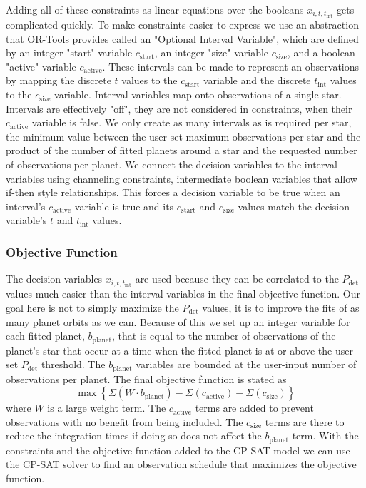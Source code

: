 Adding all of these constraints as linear equations over the booleans $x_{i, t,
t_{\textrm{int}}}$ gets complicated quickly. To make constraints easier to
express we use an abstraction that OR-Tools provides called an "Optional
Interval Variable", which are defined by an integer "start" variable
$c_\textrm{start}$, an integer "size" variable $c_\textrm{size}$, and a boolean
"active" variable $c_\textrm{active}$. These intervals can be made to represent
an observations by mapping the discrete $t$ values to the $c_\textrm{start}$
variable and the discrete $t_\textrm{int}$ values to the $c_\textrm{size}$
variable. Interval variables map onto observations of a single star. Intervals
are effectively "off", they are not considered in constraints, when their
$c_\textrm{active}$ variable is false. We only create as many intervals as is
required per star, the minimum value between the user-set maximum observations
per star and the product of the number of fitted planets around a star and the
requested number of observations per planet. We connect the decision variables
to the interval variables using channeling constraints, intermediate boolean
variables that allow if-then style relationships. This forces a decision
variable to be true when an interval's $c_\textrm{active}$ variable is true and
its $c_\textrm{start}$ and $c_\textrm{size}$ values match the decision
variable's $t$ and $t_\textrm{int}$ values.

\subsubsection{Objective Function}

The decision variables $x_{i, t, t_{\textrm{int}}}$ are used because they can
be correlated to the $P_\textrm{det}$ values much easier than the interval
variables in the final objective function. Our goal here is not to simply
maximize the $P_\textrm{det}$ values, it is to improve the fits of as many
planet orbits as we can. Because of this we set up an integer variable for each
fitted planet, $b_\textrm{planet}$, that is equal to the number of observations
of the planet's star that occur at a time when the fitted planet is at or above
the user-set $P_\textrm{det}$ threshold. The $b_\textrm{planet}$ variables are
bounded at the user-input number of observations per planet. The final
objective function is stated as 
\begin{equation}
  \max{\left\{ \Sigma\left(W \cdot
  b_\textrm{planet}\right) - \Sigma\left( c_\textrm{active}\right) - \Sigma\left(
  c_\textrm{size}\right) \right\}}
  \label{eq:final_obj_function}
\end{equation}
where $W$ is a large weight term. The
$c_\textrm{active}$ terms are added to prevent observations with no benefit
from being included. The $c_\textrm{size}$ terms are there to reduce the
integration times if doing so does not affect the $b_\textrm{planet}$ term.
With the constraints and the objective function added to the CP-SAT model we
can use the CP-SAT solver to find an observation schedule that maximizes the
objective function.

